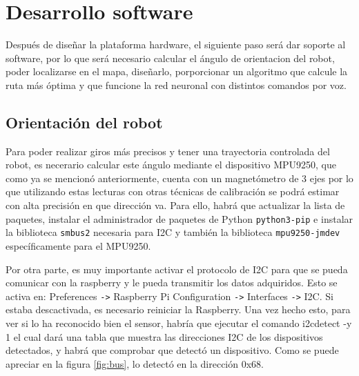 \section{Desarrollo software}
\label{sec:desarrollo_software}

Después de diseñar la plataforma hardware, el siguiente paso será dar soporte al software, por lo que será necesario calcular el ángulo de orientacion del robot, poder localizarse en el mapa, diseñarlo, porporcionar un algoritmo que calcule la ruta más óptima y que funcione la red neuronal con distintos comandos por voz.


\subsection{Orientación del robot}
\label{subsec:orientacion_robot}

Para poder realizar giros más precisos y tener una trayectoria controlada del robot, es necerario calcular este ángulo mediante el dispositivo MPU9250, que como ya se mencionó anteriormente, cuenta con un magnetómetro de 3 ejes por lo que utilizando estas lecturas con otras técnicas de calibración se podrá estimar con alta precisión en que dirección va. Para ello, habrá que actualizar la lista de paquetes, instalar el administrador de paquetes de Python \verb|python3-pip|  e instalar la biblioteca \verb|smbus2| necesaria para I2C y también la biblioteca \verb|mpu9250-jmdev| específicamente para el MPU9250.



Por otra parte, es muy importante activar el protocolo de I2C para que se pueda comunicar con la raspberry y le pueda transmitir los datos adquiridos. Esto se activa en: Preferences \texttt{->} Raspberry Pi Configuration \texttt{->} Interfaces \texttt{->} I2C. Si estaba descactivada, es necesario reiniciar la Raspberry. Una vez hecho esto, para ver si lo ha reconocido bien el sensor, habría que ejecutar el comando i2cdetect -y 1 el cual dará una tabla que muestra las direcciones I2C de los dispositivos detectados, y habrá que comprobar que detectó un dispositivo. Como se puede apreciar en la figura \ref{fig:bus}, lo detectó en la dirección 0x68.


